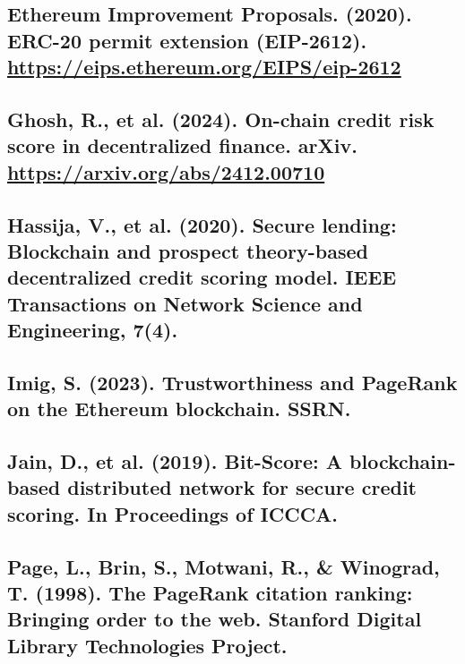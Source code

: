 \documentclass[
]{article}
\begin{document}
\subsection{\texorpdfstring{Ethereum Improvement Proposals. (2020). ERC-20 permit extension (EIP-2612). \url{https://eips.ethereum.org/EIPS/eip-2612}}{Ethereum Improvement Proposals. (2020). ERC-20 permit extension (EIP-2612). https://eips.ethereum.org/EIPS/eip-2612}}\label{ethereum-improvement-proposals.-2020.-erc-20-permit-extension-eip-2612.-httpseips.ethereum.orgeipseip-2612}

\subsection{\texorpdfstring{Ghosh, R., et al. (2024). On-chain credit risk score in decentralized finance. arXiv. \url{https://arxiv.org/abs/2412.00710}}{Ghosh, R., et al. (2024). On-chain credit risk score in decentralized finance. arXiv. https://arxiv.org/abs/2412.00710}}\label{ghosh-r.-et-al.-2024.-on-chain-credit-risk-score-in-decentralized-finance.-arxiv.-httpsarxiv.orgabs2412.00710}

\subsection{Hassija, V., et al. (2020). Secure lending: Blockchain and prospect theory-based decentralized credit scoring model. IEEE Transactions on Network Science and Engineering, 7(4).}\label{hassija-v.-et-al.-2020.-secure-lending-blockchain-and-prospect-theory-based-decentralized-credit-scoring-model.-ieee-transactions-on-network-science-and-engineering-74.}

\subsection{Imig, S. (2023). Trustworthiness and PageRank on the Ethereum blockchain. SSRN.}\label{imig-s.-2023.-trustworthiness-and-pagerank-on-the-ethereum-blockchain.-ssrn.}

\subsection{Jain, D., et al. (2019). Bit-Score: A blockchain-based distributed network for secure credit scoring. In Proceedings of ICCCA.}\label{jain-d.-et-al.-2019.-bit-score-a-blockchain-based-distributed-network-for-secure-credit-scoring.-in-proceedings-of-iccca.}

\subsection{Page, L., Brin, S., Motwani, R., \& Winograd, T. (1998). The PageRank citation ranking: Bringing order to the web. Stanford Digital Library Technologies Project.}\label{page-l.-brin-s.-motwani-r.-winograd-t.-1998.-the-pagerank-citation-ranking-bringing-order-to-the-web.-stanford-digital-library-technologies-project.}
\end{document}
